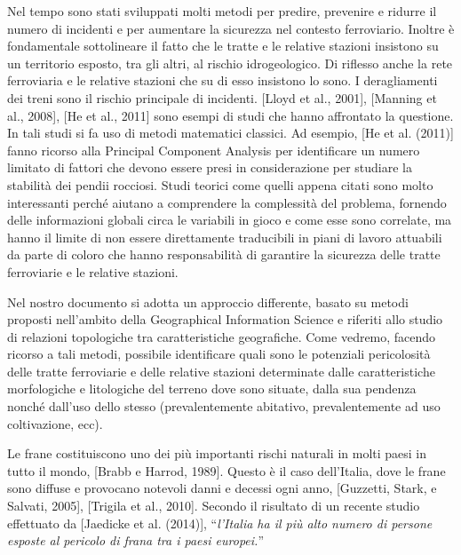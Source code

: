 Nel tempo sono stati sviluppati molti metodi per predire, prevenire e ridurre il numero di incidenti e per aumentare la sicurezza nel contesto ferroviario. Inoltre è fondamentale sottolineare il fatto che le tratte e le relative stazioni insistono su un territorio esposto, tra gli altri, al rischio idrogeologico. Di riflesso anche la rete ferroviaria e le relative stazioni che su di esso insistono lo sono. I deragliamenti dei treni sono il rischio principale di incidenti. [Lloyd et al., 2001], [Manning et al., 2008], [He et al., 2011] sono esempi di studi che hanno affrontato la questione. In tali studi si fa uso di metodi matematici classici. Ad esempio, [He et al. (2011)] fanno ricorso alla Principal Component Analysis per identificare un numero limitato di fattori che devono essere presi in considerazione per studiare la stabilità dei pendii rocciosi. Studi teorici come quelli appena citati sono molto interessanti perché aiutano a comprendere la complessità del problema, fornendo delle informazioni globali circa le variabili in gioco e come esse sono correlate, ma hanno il limite di non essere direttamente traducibili in piani di lavoro attuabili da parte di coloro che hanno responsabilità di garantire la sicurezza delle tratte ferroviarie e le relative stazioni.\newline

Nel nostro documento si adotta un approccio differente, basato su metodi proposti nell'ambito della Geographical Information Science e riferiti allo studio di relazioni topologiche tra caratteristiche geografiche. Come vedremo, facendo ricorso a tali metodi, possibile identificare quali sono le potenziali pericolosità delle tratte ferroviarie e delle relative stazioni determinate dalle caratteristiche morfologiche e litologiche del terreno dove sono situate, dalla sua pendenza nonché dall'uso dello stesso (prevalentemente abitativo, prevalentemente ad uso coltivazione, ecc).\newline 

Le frane costituiscono uno dei più importanti rischi naturali in molti paesi in tutto il mondo, [Brabb e Harrod, 1989]. Questo è il caso dell’Italia, dove le frane sono diffuse e provocano notevoli danni e decessi ogni anno, [Guzzetti, Stark, e Salvati, 2005], [Trigila et al., 2010]. Secondo il risultato di un recente studio effettuato da [Jaedicke et al. (2014)], “\textit{l'Italia ha il più alto numero di persone esposte al pericolo di frana tra i paesi europei.}”\newline

